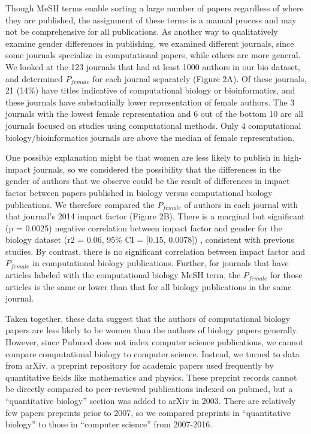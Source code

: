 \documentclass[10pt,letterpaper]{article}
\begin{document}
\begin{flushleft}
Though MeSH terms enable sorting a large number of papers regardless of where they are published, the assignment of these terms is a manual process and may not be comprehensive for all publications. As another way to qualitatively examine gender differences in publishing, we examined different journals, since some journals specialize in computational papers, while others are more general. We looked at the 123  journals that had at least 1000 authors in our bio dataset, and determined $P_{female}$ for each journal separately (Figure 2A). Of these journals, 21 (14\%) have titles indicative of computational biology or bioinformatics, and these journals have substantially lower representation of female authors. The 3 journals with the lowest female representation and 6 out of the bottom 10 are all journals focused on studies using computational methods. Only 4 computational biology/bioinformatics journals are above the median of female representation.

One possible explanation might be that women are less likely to publish in high-impact journals, so we considered the possibility that the differences in the gender of authors that we observe could be the result of differences in impact factor between papers published in biology versus computational biology publications. We therefore compared the $P_{female}$ of authors in each journal with that journal’s 2014 impact factor (Figure 2B). There is a marginal but significant (p = 0.0025) negative correlation between impact factor and gender for the biology dataset (r2 = 0.06, 95\% CI = [0.15, 0.0078]) , consistent with previous studies. By contrast, there is no significant correlation between impact factor and $P_{female}$ in computational biology publications. Further, for journals that have articles labeled with the computational biology MeSH term, the $P_{female}$ for those articles is the same or lower than that for all biology publications in the same journal.

Taken together, these data suggest that the authors of computational biology papers are less likely to be women than the authors of biology papers generally. However, since Pubmed does not index computer science publications, we cannot compare computational biology to computer science. Instead, we turned to data from arXiv, a preprint repository for academic papers used frequently by quantitative fields like mathematics and physics. These preprint records cannot be directly compared to peer-reviewed publications indexed on pubmed, but a “quantitative biology” section was added to arXiv in 2003. There are relatively few papers preprints prior to 2007, so we compared preprints in “quantitative biology” to those in “computer science” from 2007-2016.


\end{flushleft}
\end{document}
